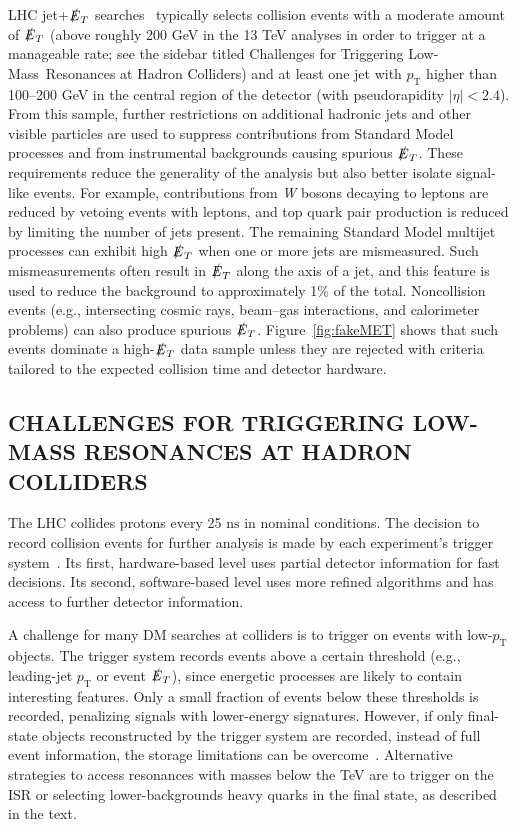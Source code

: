\documentclass{ar-1col}
\newcommand{\pt}{\ensuremath{p_\mathrm{T}}\xspace}
\newcommand{\MET}{\ensuremath{\slashed{E}_T}\xspace}
\begin{document}
{LHC jet+\MET searches~\cite{Aaboud:2017phn,Sirunyan:2017jix}
typically selects collision events with a moderate amount of \MET
(above roughly 200 GeV in the 13 TeV analyses in order to trigger at a manageable rate;
see the sidebar titled Challenges for Triggering Low-Mass\ Resonances at Hadron Colliders)
and at least one jet with \pt higher than 100--200 GeV in the central
region of the detector (with pseudorapidity $|\eta|<2.4$).
From this sample, further
restrictions on additional hadronic jets and other visible
particles are used to suppress contributions from Standard Model processes and
from instrumental backgrounds causing spurious \MET. These
requirements reduce the generality of the analysis but also better
isolate signal-like events. For example, contributions from \textit{W}
bosons decaying to leptons are reduced by vetoing events with
leptons, and top quark pair production is reduced by limiting the number
of jets present. The remaining Standard Model multijet processes can exhibit
high \MET when one or more jets are mismeasured. Such
mismeasurements often result in \MET along the axis of a jet, and
this feature is used to reduce the background to approximately 1\% of the
total. Noncollision events (e.g., intersecting cosmic rays,
beam--gas interactions, and calorimeter problems) can also produce
spurious \MET. Figure~\ref{fig:fakeMET} shows that such
events dominate a high-\MET data sample unless they are rejected with
criteria tailored to the expected collision time and detector
hardware.

\begin{textbox}
\section{CHALLENGES FOR TRIGGERING LOW-MASS RESONANCES AT HADRON COLLIDERS}

\noindent The LHC collides protons every 25 $\mathrm{ns}$ in nominal
conditions. The decision to record collision events for further
analysis is made by each experiment's trigger
system~\cite{Smith:2016vcs,Aaboud:2016leb,Khachatryan:2016bia,Aaij:2012me}.
Its first, hardware-based level uses partial detector information
for fast decisions. Its second, software-based level uses more
refined algorithms and has access to further detector information.

A challenge for many DM searches at colliders is to trigger on events with low-\pt objects.  
The trigger system records events above a certain threshold (e.g., leading-jet \pt or event
\MET), since energetic processes are likely to contain interesting
features. Only a small fraction of events below these thresholds
is recorded, penalizing signals with lower-energy signatures.
However, if only final-state objects reconstructed by the trigger
system are recorded, instead of full event information, the
storage limitations can be
overcome~\cite{Aaij:2016rxn,Khachatryan:2016ecr,Aaboud:2018fzt}.
Alternative strategies to access resonances with masses below the TeV 
are to trigger on the ISR or selecting lower-backgrounds heavy quarks in the final state,
as described in the text. 


\end{textbox}}
\end{document}
